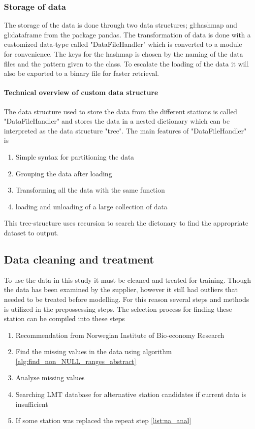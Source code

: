\subsubsection{Storage of data}
The storage of the data is done through two data structures; \gls{gl:hashmap} and \gls{gl:dataframe} from the package pandas. The transformation of data is done with a customized data-type called "DataFileHandler" which is converted to a module for convenience. The keys for the hashmap is chosen by the naming of the data files and the pattern given to the class. To escalate the loading of the data it will also be exported to a binary file for faster retrieval. 

\paragraph[Data structure]{Technical overview of custom data structure}
The data structure used to store the data from the different stations is called "DataFileHandler" and stores the data in a nested dictionary which can be interpreted as the data structure "tree". The main features of "DataFileHandler" is 
\begin{enumerate}
	\item Simple syntax for partitioning the data
	\item Grouping the data after loading
	\item Transforming all the data with the same function
	\item loading and unloading of a large collection of data
\end{enumerate}

This tree-structure uses recursion to search the dictonary to find the appropriate dataset to output. 

\subsection{Data cleaning and treatment}

To use the data in this study it must be cleaned and treated for training. Though the data has been examined by the supplier, however it still had outliers that needed to be treated before modelling. For this reason several steps and methods is utilized in the prepossessing steps. The selection process for finding these station can be compiled into these steps

\begin{enumerate}
	\item Recommendation from Norwegian Institute of Bio-economy Research
	\item \label{list:na_anal}Find the missing values in the data using algorithm \ref{alg:find_non_NULL_ranges_abstract}
	\item Analyse missing values 
	\item Searching LMT database for alternative station candidates if current data is insufficient
	\item If some station was replaced the repeat step \ref{list:na_anal}
\end{enumerate}

